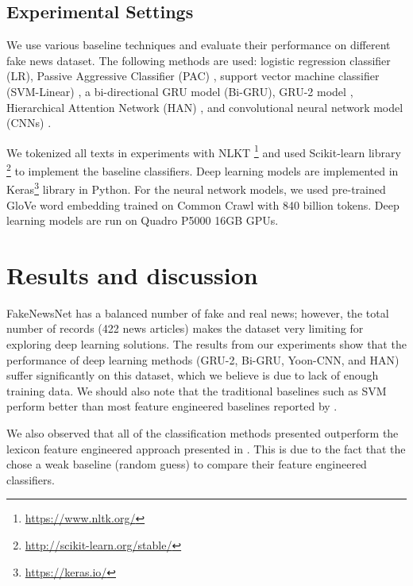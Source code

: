 \subsection{Experimental Settings}
We use various baseline techniques and evaluate their performance on different fake news dataset. The following methods are used: logistic regression classifier (LR), Passive Aggressive Classifier (PAC) \cite{Crammer:2006:OPA:1248547.1248566}, support vector machine classifier (SVM-Linear) \cite{Crammer:2002:AIM:944790.944813}, a bi-directional GRU model (Bi-GRU),  GRU-2 model \cite{Ma2016DetectingRF}, Hierarchical Attention Network (HAN) \cite{Yang2016HierarchicalAN}, and convolutional neural network model (CNNs) \cite{Kim14convolutionalneural}. 

We tokenized all texts in experiments with NLKT \footnote{\url{https://www.nltk.org/}} and used Scikit-learn library \footnote{\url{http://scikit-learn.org/stable/}} to implement the baseline classifiers. Deep learning models are implemented in Keras\footnote{\url{https://keras.io/}} library in Python. For the neural network models, we used pre-trained GloVe \cite{pennington2014glove} word embedding trained on Common Crawl with 840 billion tokens.  Deep learning models are run on Quadro P5000 16GB GPUs.

\section{Results and discussion}
FakeNewsNet has a balanced number of fake and real news; however, the total number of records (422 news articles) makes the dataset very limiting for exploring deep learning solutions. The results from our experiments show that the performance of deep learning methods (GRU-2, Bi-GRU, Yoon-CNN, and HAN) suffer significantly on this dataset, which we believe is due to lack of enough training data. We should also note that the traditional baselines such as SVM perform better than most feature engineered baselines reported by \citet{shu2018}.  

We also observed that all of the classification methods presented outperform the lexicon feature engineered approach presented in \citep{Rashkin2017TruthOV}. This is due to the fact that the \citet{Rashkin2017TruthOV} chose a weak baseline (random guess) to compare their feature engineered classifiers.  


